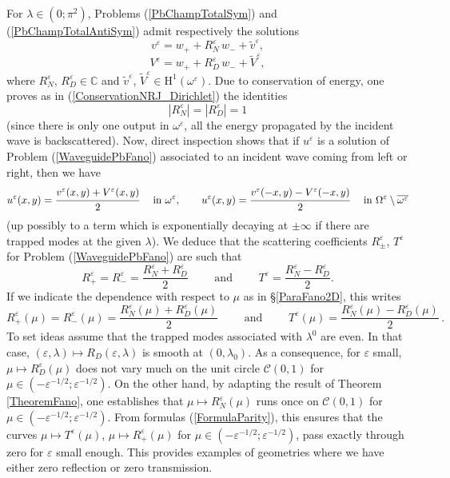 \documentclass[11pt,a4paper]{report}
\newcommand{\eps}{\varepsilon}
\newcommand{\om}{\omega}
\newcommand{\Om}{\Omega}
\newcommand{\mrm}[1]{\mathrm{#1}}
\newcommand{\Cplx}{\mathbb{C}}
\newcommand{\mH}{\mrm{H}}
\begin{document}
For $\lambda\in(0;\pi^2)$, Problems (\ref{PbChampTotalSym}) and (\ref{PbChampTotalAntiSym}) admit respectively the solutions 
\[
v^\eps = w_++R^\eps_N\,w_- + \tilde{v}^\eps,
\]
\[
V^\eps= w_++R^\eps_D\,w_- + \tilde{V}^\eps,
\]
where $R^\eps_N$, $R^\eps_D\in\Cplx$ and $\tilde{v}^\eps$, $\tilde{V}^\eps\in\mH^1(\om^\eps)$. Due to conservation of energy, one proves as in (\ref{ConservationNRJ_Dirichlet}) the identities
\[
|R^\eps_N|=|R^\eps_D|=1
\]
(since there is only one output in $\om^\eps$, all the energy propagated by the incident wave is backscattered).   
Now, direct inspection shows that if $u^\eps$ is a solution of Problem (\ref{WaveguidePbFano}) associated to an incident wave coming from left or right, then we have
\[
u^\eps(x,y)=\cfrac{v^\eps(x,y)+V^\eps(x,y)}{2}\quad\mbox{ in }\om^\eps,\qquad u^\eps(x,y)=\cfrac{v^\eps(-x,y)-V^\eps(-x,y)}{2}\quad\mbox{ in }\Om^\eps\setminus\overline{\om^\eps}
\]
(up possibly to a term which is exponentially decaying at $\pm\infty$ if there are trapped modes at the given $\lambda$). We deduce that the scattering coefficients $R_\pm^\eps$, $T^\eps$ for Problem (\ref{WaveguidePbFano}) are such that
\[
R_+^\eps=R_-^\eps=\frac{R^\eps_N+R^\eps_D}{2}\qquad\mbox{ and }\qquad T^\eps=\frac{R^\eps_N-R^\eps_D}{2}.
\]
If we indicate the dependence with respect to $\mu$ as in \S\ref{ParaFano2D}, this writes 
\begin{equation}\label{FormulaParity}
R^{\eps}_+(\mu)=R^{\eps}_-(\mu)=\frac{R_N^\eps(\mu)+R_D^\eps(\mu)}{2}\qquad\mbox{ and }\qquad T^\eps(\mu)=\frac{R_N^\eps(\mu)-R_D^\eps(\mu)}{2}\,.
\end{equation}
To set ideas assume that the trapped modes associated with $\lambda^0$ are even. In that case, $(\eps,\lambda)\mapsto R_D(\eps,\lambda)$ is smooth at $(0,\lambda_0)$. As a consequence, for $\eps$ small, $\mu\mapsto R_D^\eps(\mu)$ does not vary much on the unit circle $\mathscr{C}(0,1)$ for $\mu\in(-\eps^{-1/2};\eps^{-1/2})$. On the other hand, by adapting the result of Theorem \ref{TheoremFano}, one establishes that $\mu\mapsto R_N^\eps(\mu)$ runs once on $\mathscr{C}(0,1)$ for $\mu\in(-\eps^{-1/2};\eps^{-1/2})$. From formulas (\ref{FormulaParity}), this ensures that the curves $\mu\mapsto T^{\eps}(\mu)$, $\mu\mapsto R^{\eps}_+(\mu)$ for $\mu\in(-\eps^{-1/2};\eps^{-1/2})$, pass exactly through zero for $\eps$ small enough. This provides examples of geometries where we have either zero reflection or zero transmission. 
\end{document}
